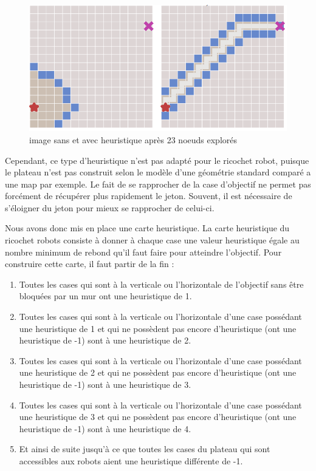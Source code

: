 \documentclass[a4paper, 12pt]{article}
\begin{document}
           \begin{figure}[H]
                \centering
                \includegraphics[scale=0.75]{images/2.png}
                \caption{image\cite{redblob} sans et avec heuristique après 23 noeuds explorés }
            \end{figure}
            
        Cependant, ce type d'heuristique n'est pas adapté pour le ricochet robot, puisque le plateau n'est pas construit selon le modèle d'une géométrie standard comparé a une map par exemple. Le fait de se rapprocher de la case d'objectif ne permet pas forcément de récupérer plus rapidement le jeton. Souvent, il est nécessaire de s'éloigner du jeton pour mieux se rapprocher de celui-ci.
        
        Nous avons donc mis en place une carte heuristique. La carte heuristique du ricochet robots consiste à donner à chaque case une valeur heuristique égale au nombre minimum de rebond qu'il faut faire pour atteindre l'objectif. Pour construire cette carte, il faut partir de la fin :
        
        \begin{enumerate}
            \item Toutes les cases qui sont à la verticale ou l'horizontale de  l'objectif sans être bloquées par un mur ont une heuristique de 1.
            \item Toutes les cases qui sont à la verticale ou l'horizontale d'une case possédant une heuristique de 1 et qui ne possèdent pas encore d'heuristique (ont une heuristique de -1) sont à une heuristique de 2.
            \item Toutes les cases qui sont à la verticale ou l'horizontale d'une case possédant une heuristique de 2 et qui ne possèdent pas encore d'heuristique (ont une heuristique de -1) sont à une heuristique de 3.
            \item Toutes les cases qui sont à la verticale ou l'horizontale d'une case possédant une heuristique de 3 et qui ne possèdent pas encore d'heuristique (ont une heuristique de -1) sont à une heuristique de 4.
            \item Et ainsi de suite jusqu'à ce que toutes les cases du plateau qui sont accessibles aux robots aient une heuristique différente de -1.
        \end{enumerate}
        
\end{document}
